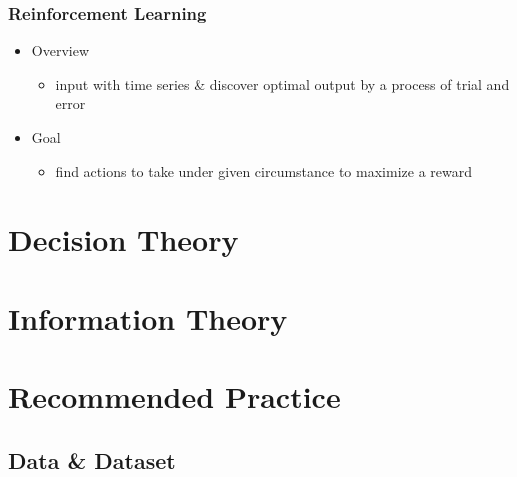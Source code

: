 \subsubsection{Reinforcement Learning}
\begin{itemize}
\item Overview
	\begin{itemize}
	\item input with time series \& discover optimal output by a process of trial and error
	\end{itemize}
\item Goal
	\begin{itemize}
	\item find actions to take under given circumstance to maximize a reward
	\end{itemize}
\end{itemize}

%

\section{Decision Theory}
\subsection{}
 
\section{Information Theory}
 


\section{Recommended Practice}
\subsection{Data \& Dataset}
